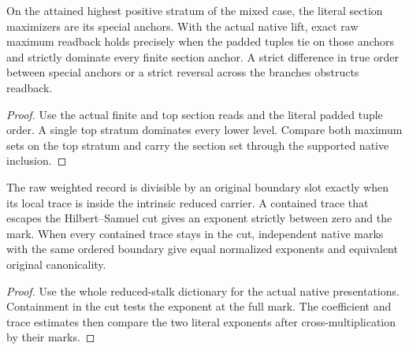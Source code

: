 \begin{theorem}
\label{hir:g1-later-positive-mixed-centre-criterion}
\leanok
On the attained highest positive stratum of the mixed
case, the literal section maximizers are its special
anchors. With the actual native lift, exact raw maximum
readback holds precisely when the padded tuples tie on
those anchors and strictly dominate every finite
section anchor. A strict difference in true order
between special anchors or a strict reversal across
the branches obstructs readback.
\end{theorem}
\begin{proof}
Use the actual finite and top section reads and the
literal padded tuple order. A single top stratum
dominates every lower level. Compare both maximum sets
on the top stratum and carry the section set through
the supported native inclusion.
\end{proof}

\begin{theorem}
\label{hir:g1-native-raw-boundary-trace}
\leanok
The raw weighted record is divisible by an original
boundary slot exactly when its local trace is inside the
intrinsic reduced carrier. A contained trace that escapes
the Hilbert--Samuel cut gives an exponent strictly
between zero and the mark. When every contained trace
stays in the cut, independent native marks with the same
ordered boundary give equal normalized exponents and
equivalent original canonicality.
\end{theorem}
\begin{proof}
Use the whole reduced-stalk dictionary for the actual
native presentations. Containment in the cut tests
the exponent at the full mark. The coefficient and
trace estimates then compare the two literal exponents
after cross-multiplication by their marks.
\end{proof}

